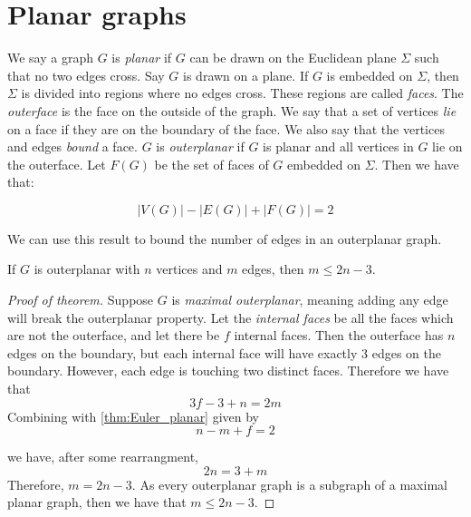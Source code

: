 \section{Planar graphs}\label{sec:Planar graphs}
We say a graph \(G\) is \textit{planar} if \(G\) can be drawn on the Euclidean plane \(\Sigma \) such that no two edges cross. Say \(G\) is drawn on a plane. If \(G\) is embedded on \(\Sigma \), then \(\Sigma \) is divided into regions where no edges cross. These regions are called \textit{faces}. The \textit{outerface} is the face on the outside of the graph. We say that a set of vertices \textit{lie} on a face if they are on the boundary of the face. We also say that the vertices and edges \textit{bound} a face. \(G\) is \textit{outerplanar} if \(G\) is planar and all vertices in \(G\) lie on the outerface.
Let \(F(G)\) be the set of faces of \(G\) embedded on \(\Sigma\). Then we have that:
\begin{theorem}\label{thm:Euler_planar}
	\begin{equation}
		|V(G)| - |E(G)| + |F(G)| = 2
	\end{equation}
\end{theorem}

We can use this result to bound the number of edges in an outerplanar graph.
\begin{theorem}\label{thm:outerplanar_bound}
	If \(G\) is outerplanar with \(n\) vertices and \(m\) edges, then \(m \leq 2n - 3\).
\end{theorem}

\begin{proof}[Proof of theorem]
	Suppose \(G\) is \textit{maximal outerplanar}, meaning adding any edge will break the outerplanar property. Let the \textit{internal faces} be all the faces which are not the outerface, and let there be \(f\) internal faces. Then the outerface has \(n\) edges on the boundary, but each internal face will have exactly \(3\) edges on the boundary. However, each edge is touching two distinct faces. Therefore we have that
	\begin{equation}
		3 f - 3 + n = 2m
	\end{equation}
	Combining with \cref{thm:Euler_planar} given by
	\begin{equation}
		n - m + f = 2
	\end{equation}

	we have, after some rearrangment,
	\begin{equation}
		2n = 3 + m
	\end{equation}
	Therefore, \(m = 2n - 3\). As every outerplanar graph is a subgraph of a maximal planar graph, then we have that \(m \leq 2n - 3\).
\end{proof}
